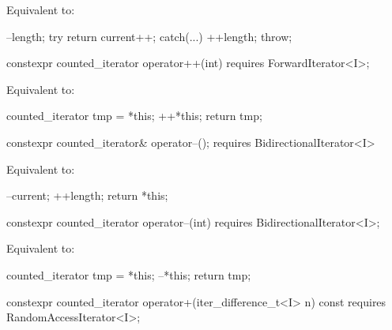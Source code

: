 \begin{addedblock}
\begin{itemdescr}
\pnum
\effects Equivalent to:
\begin{codeblock}
--length;
try { return current++; }
catch(...) { ++length; throw; }
\end{codeblock}
\end{itemdescr}

\begin{itemdecl}
constexpr counted_iterator operator++(int)
  requires ForwardIterator<I>;
\end{itemdecl}

\begin{itemdescr}
\pnum
\effects Equivalent to:
\begin{codeblock}
counted_iterator tmp = *this;
++*this;
return tmp;
\end{codeblock}
\end{itemdescr}

%
%
\begin{itemdecl}
  constexpr counted_iterator& operator--();
    requires BidirectionalIterator<I>
\end{itemdecl}

\begin{itemdescr}
\pnum
\effects Equivalent to:
\begin{codeblock}
--current;
++length;
return *this;
\end{codeblock}
\end{itemdescr}

%
%
\begin{itemdecl}
  constexpr counted_iterator operator--(int)
    requires BidirectionalIterator<I>;
\end{itemdecl}

\begin{itemdescr}
\pnum
\effects Equivalent to:
\begin{codeblock}
counted_iterator tmp = *this;
--*this;
return tmp;
\end{codeblock}
\end{itemdescr}

%
%
\begin{itemdecl}
  constexpr counted_iterator operator+(iter_difference_t<I> n) const
    requires RandomAccessIterator<I>;
\end{itemdecl}


\end{addedblock}
